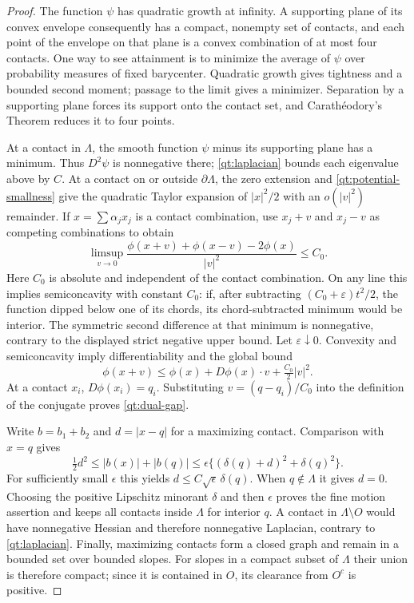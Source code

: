 \documentclass[11pt]{article}
\numberwithin{equation}{section}
\theoremstyle{definition}
\theoremstyle{remark}
\begin{document}
\begin{proof}
The function $\psi$ has quadratic growth at infinity.  A supporting
plane of its convex envelope consequently has a compact, nonempty set
of contacts, and each point of the envelope on that plane is a convex
combination of at most four contacts.  One way to see attainment is to
minimize the average of $\psi$ over probability measures of fixed
barycenter.  Quadratic growth gives tightness and a bounded second
moment; passage to the limit gives a minimizer.  Separation by a
supporting plane forces its support onto the contact set, and
Carath\'eodory's Theorem reduces it to four points.

At a contact in $\Lambda$, the smooth function $\psi$ minus its
supporting plane has a minimum.  Thus $D^2\psi$ is nonnegative there;
\eqref{qt:laplacian} bounds each eigenvalue above by $C$.  At a contact
on or outside $\partial\Lambda$, the zero extension and
\eqref{qt:potential-smallness} give the quadratic Taylor expansion of
$|x|^2/2$ with an $o(|v|^2)$ remainder.  If
$x=\sum\alpha_jx_j$ is a contact combination, use $x_j+v$ and $x_j-v$
as competing combinations to obtain
\[
 \limsup_{v\to0}
 \frac{\phi(x+v)+\phi(x-v)-2\phi(x)}{|v|^2}\leq C_0.
\]
Here $C_0$ is absolute and independent of the contact combination.
On any line this implies semiconcavity with constant $C_0$: if, after
subtracting $(C_0+\varepsilon)t^2/2$, the function dipped below one of
its chords, its chord-subtracted minimum would be interior.  The
symmetric second difference at that minimum is nonnegative, contrary
to the displayed strict negative upper bound.  Let $\varepsilon\downarrow0$.
Convexity and semiconcavity imply differentiability and the global bound
\[
 \phi(x+v)\leq\phi(x)+D\phi(x)\cdot v+\tfrac{C_0}2|v|^2.
\]
At a contact $x_i$, $D\phi(x_i)=q_i$.  Substituting
$v=(q-q_i)/C_0$ into the definition of the conjugate proves
\eqref{qt:dual-gap}.

Write $b=b_1+b_2$ and $d=|x-q|$ for a maximizing contact.  Comparison
with $x=q$ gives
\[
 \tfrac12d^2\leq |b(x)|+|b(q)|
 \leq\epsilon\{(\delta(q)+d)^2+\delta(q)^2\}.
\]
For sufficiently small $\epsilon$ this yields
$d\leq C\sqrt\epsilon\,\delta(q)$.  When $q\notin\Lambda$ it gives
$d=0$.  Choosing the positive Lipschitz minorant $\delta$ and then
$\epsilon$ proves the fine motion assertion and keeps all contacts
inside $\Lambda$ for interior $q$.  A contact in $\Lambda\setminus O$
would have nonnegative Hessian and therefore nonnegative Laplacian,
contrary to \eqref{qt:laplacian}.  Finally, maximizing contacts form a
closed graph and remain in a bounded set over bounded slopes.  For
slopes in a compact subset of $\Lambda$ their union is therefore
compact; since it is contained in $O$, its clearance from $O^c$ is
positive.
\end{proof}
\end{document}
